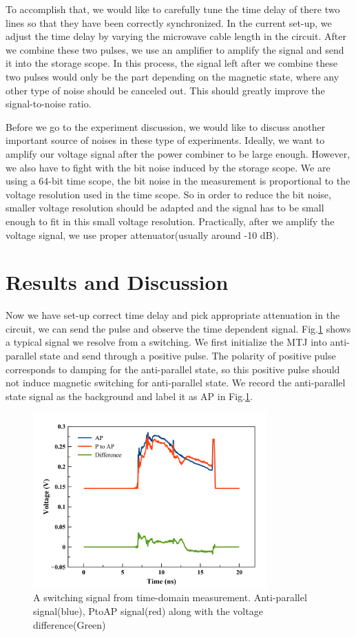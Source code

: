 To accomplish that, we would like to carefully tune the time delay of there two lines so that they have been correctly synchronized. In the current set-up, we adjust the time delay by varying the microwave cable length in the circuit. After we combine these two pulses, we use an amplifier to amplify the signal and send it into the storage scope. In this process, the signal left after we combine these two pulses would only be the part depending on the magnetic state, where any other type of noise should be canceled out. This should greatly improve the signal-to-noise ratio.

Before we go to the experiment discussion, we would like to discuss another important source of noises in these type of experiments. Ideally, we want to amplify our voltage signal after the power combiner to be large enough. However, we also have to fight with the bit noise induced by the storage scope. We are using a 64-bit time scope, the bit noise in the measurement is proportional to the voltage resolution used in the time scope. So in order to reduce the bit noise, smaller voltage resolution should be adapted and the signal has to be small enough to fit in this small voltage resolution. Practically, after we amplify the voltage signal, we use proper attenuator(usually around -10 dB).

\section{Results and Discussion}

Now we have set-up correct time delay and pick appropriate attenuation in the circuit, we can send the pulse and observe the time dependent signal. Fig.\ref{fig:Total_sig} shows a typical signal we resolve from a switching. We first initialize the MTJ into anti-parallel state and send through a positive pulse. The polarity of positive pulse corresponds to damping for the anti-parallel state, so this positive pulse should not induce magnetic switching for anti-parallel state. We record the anti-parallel state signal as the background and label it as AP in Fig.\ref{fig:Total_sig}. 

\begin{figure}[h]
  \centering
  \includegraphics[width=0.8\textwidth]{fig/total_sig}
  \caption{A switching signal from time-domain measurement. Anti-parallel signal(blue), PtoAP signal(red) along with the voltage difference(Green)}
  \label{fig:Total_sig}
\end{figure}


